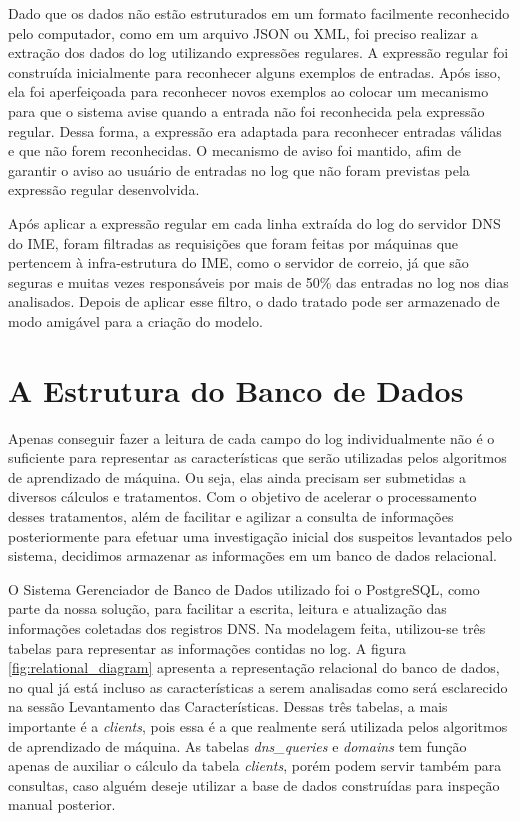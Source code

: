 Dado que os dados não estão estruturados em um formato facilmente reconhecido pelo computador, como em um arquivo JSON ou XML, foi preciso realizar a extração dos dados do log utilizando expressões regulares. A expressão regular foi construída inicialmente para reconhecer alguns exemplos de entradas. Após isso, ela foi aperfeiçoada para reconhecer novos exemplos ao colocar um mecanismo para que o sistema avise quando a entrada não foi reconhecida pela expressão regular. Dessa forma, a expressão era adaptada para reconhecer entradas válidas e que não forem reconhecidas. O mecanismo de aviso foi mantido, afim de garantir o aviso ao usuário de entradas no log que não foram previstas pela expressão regular desenvolvida.

Após aplicar a expressão regular em cada linha extraída do log do servidor DNS do IME, foram filtradas as requisições que foram feitas por máquinas que pertencem à infra-estrutura do IME, como o servidor de correio, já que são seguras e muitas vezes responsáveis por mais de 50\% das entradas no log nos dias analisados. Depois de aplicar esse filtro, o dado tratado pode ser armazenado de modo amigável para a criação do modelo.

\section{A Estrutura do Banco de Dados}
Apenas conseguir fazer a leitura de cada campo do log individualmente não é o suficiente para representar as características que serão utilizadas pelos algoritmos de aprendizado de máquina. Ou seja, elas ainda precisam ser submetidas a diversos cálculos e tratamentos. Com o objetivo de acelerar o processamento desses tratamentos, além de facilitar e agilizar a consulta de informações posteriormente para efetuar uma investigação inicial dos suspeitos levantados pelo sistema, decidimos armazenar as informações em um banco de dados relacional.

O Sistema Gerenciador de Banco de Dados utilizado foi o PostgreSQL, como parte da nossa solução, para facilitar a escrita, leitura e atualização das informações coletadas dos registros DNS. Na modelagem feita, utilizou-se três tabelas para representar as informações contidas no log. A figura \ref{fig:relational_diagram} apresenta a representação relacional do banco de dados, no qual já está incluso as características a serem analisadas como será esclarecido na sessão Levantamento das Características. Dessas três tabelas, a mais importante é a \textit{clients}, pois essa é a que realmente será utilizada pelos algoritmos de aprendizado de máquina. As tabelas \textit{dns\_queries} e \textit{domains} tem função apenas de auxiliar o cálculo da tabela \textit{clients}, porém podem servir também para consultas, caso alguém deseje utilizar a base de dados construídas para inspeção manual posterior.

